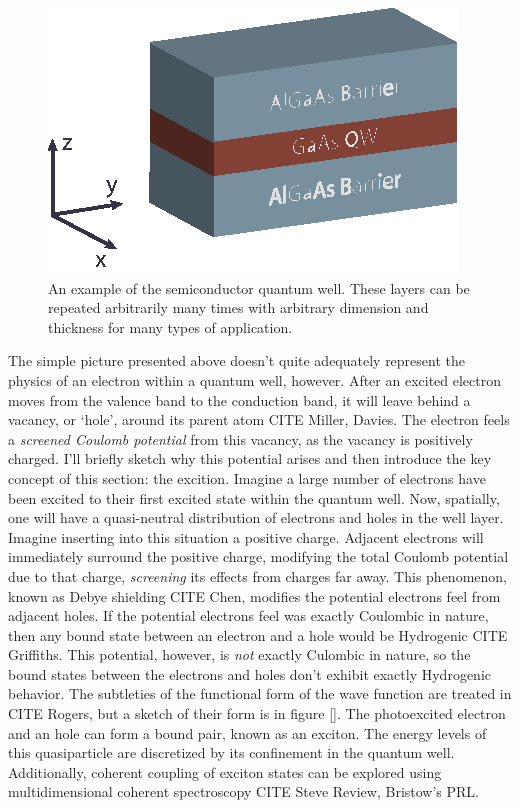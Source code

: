 \begin{figure}[h!]
\centering
\includegraphics[width = .5\textwidth]{Well.eps}
\caption{An example of the semiconductor quantum well. These layers can be repeated arbitrarily many times with arbitrary dimension and thickness for many types of application.}
\label{GaAsBstruct}
\end{figure}




\indent The simple picture presented above doesn't quite adequately represent the physics of an electron within a quantum well, however. After an excited electron moves from the valence band to the conduction band, it will leave behind a vacancy, or `hole', around its parent atom CITE Miller, Davies. The electron feels a \textit{screened Coulomb potential} from this vacancy, as the vacancy is positively charged. I'll briefly sketch why this potential arises and then introduce the key concept of this section: the excition. Imagine a large number of electrons have been excited to their first excited state within the quantum well. Now, spatially, one will have a quasi-neutral distribution of electrons and holes in the well layer. Imagine inserting into this situation a positive charge. Adjacent electrons will immediately surround the positive charge, modifying the total Coulomb potential due to that charge, \textit{screening} its effects from charges far away. This phenomenon, known as Debye shielding CITE Chen, modifies the potential electrons feel from adjacent holes. If the potential electrons feel was exactly Coulombic in nature, then any bound state between an electron and a hole would be Hydrogenic CITE Griffiths. This potential, however, is \textit{not} exactly Culombic in nature, so the bound states between the electrons and holes don't exhibit exactly Hydrogenic behavior. The subtleties of the functional form of the wave function are treated in CITE Rogers, but a sketch of their form is in figure \ref{}. The photoexcited electron and an hole can form a bound pair, known as an exciton. The energy levels of this quasiparticle are discretized by its confinement in the quantum well. Additionally, coherent coupling of exciton states can be explored using multidimensional coherent spectroscopy CITE Steve Review, Bristow's PRL. 


